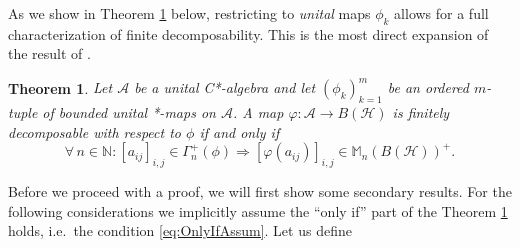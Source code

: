 \documentclass[reqno]{amsart}
\newtheorem{theorem}{Theorem}
\theoremstyle{plain}
\numberwithin{equation}{section}
\numberwithin{theorem}{section}
\numberwithin{lemma}{section}
\numberwithin{definition}{section}
\numberwithin{corollary}{section}
\numberwithin{remark}{section}
\newcommand{\naturals}{\mathbb{N}}
\newcommand{\hilbert}{\mathcal{H}}
\newcommand{\matra}[2]{\mathbb{M}_{#1}(#2)}
\begin{document}
As we show in Theorem \ref{thm:FinDecEquivCond} below, restricting to \emph{unital} maps $\phi_k$ allows for a full characterization of finite decomposability. This is the most direct expansion of the result of \cite{Stormer_1982}.

\begin{theorem}\label{thm:FinDecEquivCond}
    Let $\mathscr{A}$ be a unital C*-algebra and let $\left(\phi_k\right)_{k=1}^{m}$ be an ordered $m$-tuple of bounded unital *-maps on $\mathscr{A}$. A map $\varphi : \mathscr{A}\to B(\hilbert)$ is finitely decomposable with respect to $\phi$ if and only if
    \begin{equation}\label{eq:OnlyIfAssum}
        \forall \, n\in\naturals : \left[a_{ij}\right]_{i,j} \in \Gamma_{n}^{+}(\phi) \Rightarrow \left[\varphi(a_{ij})\right]_{i,j} \in \matra{n}{B(\hilbert)}^+ .
    \end{equation}
\end{theorem}

Before we proceed with a proof, we will first show some secondary results. For the following considerations we implicitly assume the ``only if'' part of the Theorem \ref{thm:FinDecEquivCond} holds, i.e.~the condition \eqref{eq:OnlyIfAssum}. Let us define
\end{document}
